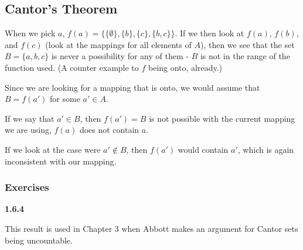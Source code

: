 \subsection{Cantor's Theorem}

When we pick $a$, $f(a) = \{ \{\emptyset\}, \{b\}, \{c\}, \{b,c\} \}$.
If we then look at $f(a)$, $f(b)$, and $f(c)$ (look at the mappings for all elements of $A$),
then we see that the set $B = \{ a, b, c \}$ is never a possibility for any of them - $B$ is
not in the range of the function used.
(A counter example to $f$ being onto, already.)

Since we are looking for a mapping that is onto, we would assume that
$B = f(a')$ for some $a' \in A$.

If we say that $a' \in B$, then $f(a') = B$ is not possible with the current mapping we are using,
$f(a)$ does not contain $a$.

If we look at the case were $a' \notin B$, then $f(a')$ would contain $a'$, which is again inconsistent
with our mapping.


\subsubsection{Exercises}

\textbf{1.6.4}

This result is used in Chapter 3 when Abbott makes an argument for Cantor sets being uncountable.
